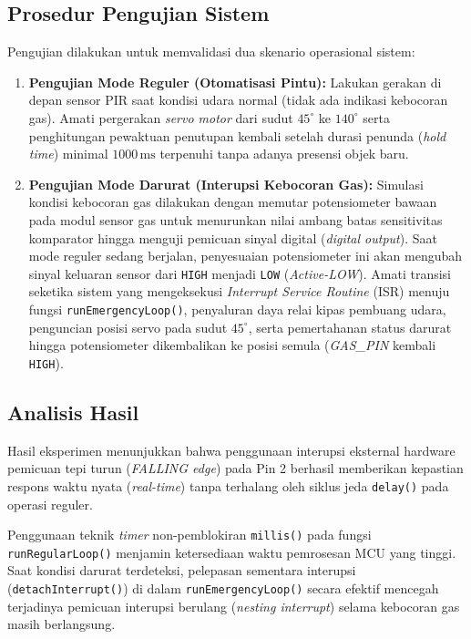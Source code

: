\subsection{Prosedur Pengujian Sistem}
Pengujian dilakukan untuk memvalidasi dua skenario operasional sistem:
\begin{enumerate}
	\item \textbf{Pengujian Mode Reguler (Otomatisasi Pintu):} Lakukan gerakan di depan sensor PIR saat kondisi udara normal (tidak ada indikasi kebocoran gas). Amati pergerakan \textit{servo motor} dari sudut $45^\circ$ ke $140^\circ$ serta penghitungan pewaktuan penutupan kembali setelah durasi penunda (\textit{hold time}) minimal $1000\,\text{ms}$ terpenuhi tanpa adanya presensi objek baru.
	\item \textbf{Pengujian Mode Darurat (Interupsi Kebocoran Gas):} Simulasi kondisi kebocoran gas dilakukan dengan memutar potensiometer bawaan pada modul sensor gas untuk menurunkan nilai ambang batas sensitivitas komparator hingga menguji pemicuan sinyal digital (\textit{digital output}). Saat mode reguler sedang berjalan, penyesuaian potensiometer ini akan mengubah sinyal keluaran sensor dari \texttt{HIGH} menjadi \texttt{LOW} (\textit{Active-LOW}). Amati transisi seketika sistem yang mengeksekusi \textit{Interrupt Service Routine} (ISR) menuju fungsi \texttt{runEmergencyLoop()}, penyaluran daya relai kipas pembuang udara, penguncian posisi servo pada sudut $45^\circ$, serta pemertahanan status darurat hingga potensiometer dikembalikan ke posisi semula (\textit{GAS\_PIN} kembali \texttt{HIGH}).
\end{enumerate}

\subsection{Analisis Hasil}
Hasil eksperimen menunjukkan bahwa penggunaan interupsi eksternal hardware pemicuan tepi turun (\textit{FALLING edge}) pada Pin 2 berhasil memberikan kepastian respons waktu nyata (\textit{real-time}) tanpa terhalang oleh siklus jeda \texttt{delay()} pada operasi reguler.

Penggunaan teknik \textit{timer} non-pemblokiran \texttt{millis()} pada fungsi \texttt{runRegularLoop()} menjamin ketersediaan waktu pemrosesan MCU yang tinggi. Saat kondisi darurat terdeteksi, pelepasan sementara interupsi (\texttt{detachInterrupt()}) di dalam \texttt{runEmergencyLoop()} secara efektif mencegah terjadinya pemicuan interupsi berulang (\textit{nesting interrupt}) selama kebocoran gas masih berlangsung.

